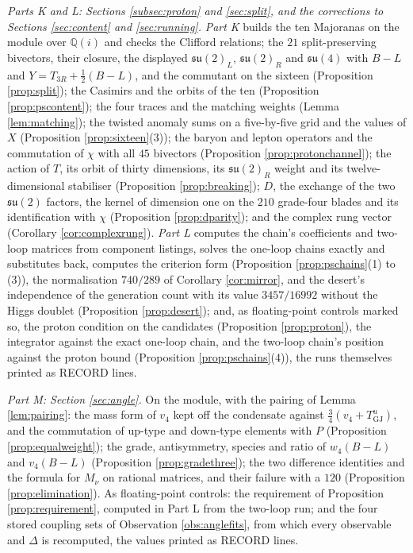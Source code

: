 \documentclass[11pt]{article}
\theoremstyle{definition}
\newcommand{\su}{\mathfrak{su}}
\begin{document}
\emph{Parts K and L: Sections \ref{subsec:proton} and \ref{sec:split}, and the corrections to Sections \ref{sec:content} and \ref{sec:running}.} \emph{Part K} builds the ten Majoranas on the module over $\mathbb{Q}(i)$ and checks the Clifford relations; the $21$ split-preserving bivectors, their closure, the displayed $\su(2)_{L}$, $\su(2)_{R}$ and $\su(4)$ with $B - L$ and $Y = T_{3R} + \tfrac12(B - L)$, and the commutant on the sixteen (Proposition \ref{prop:split}); the Casimirs and the orbits of the ten (Proposition \ref{prop:pscontent}); the four traces and the matching weights (Lemma \ref{lem:matching}); the twisted anomaly sums on a five-by-five grid and the values of $X$ (Proposition \ref{prop:sixteen}(3)); the baryon and lepton operators and the commutation of $\chi$ with all $45$ bivectors (Proposition \ref{prop:protonchannel}); the action of $T$, its orbit of thirty dimensions, its $\su(2)_{R}$ weight and its twelve-dimensional stabiliser (Proposition \ref{prop:breaking}); $D$, the exchange of the two $\su(2)$ factors, the kernel of dimension one on the $210$ grade-four blades and its identification with $\chi$ (Proposition \ref{prop:dparity}); and the complex rung vector (Corollary \ref{cor:complexrung}). \emph{Part L} computes the chain's coefficients and two-loop matrices from component listings, solves the one-loop chains exactly and substitutes back, computes the criterion form (Proposition \ref{prop:pschains}(1) to (3)), the normalisation $740/289$ of Corollary \ref{cor:mirror}, and the desert's independence of the generation count with its value $3457/16992$ without the Higgs doublet (Proposition \ref{prop:desert}); and, as floating-point controls marked so, the proton condition on the candidates (Proposition \ref{prop:proton}), the integrator against the exact one-loop chain, and the two-loop chain's position against the proton bound (Proposition \ref{prop:pschains}(4)), the runs themselves printed as RECORD lines.

\emph{Part M: Section \ref{sec:angle}.} On the module, with the pairing of Lemma \ref{lem:pairing}: the mass form of $v_{4}$ kept off the condensate against $\tfrac34(v_{4} + T^{u}_{\mathrm{GJ}})$, and the commutation of up-type and down-type elements with $P$ (Proposition \ref{prop:equalweight}); the grade, antisymmetry, species and ratio of $w_{4}(B - L)$ and $v_{4}(B - L)$ (Proposition \ref{prop:gradethree}); the two difference identities and the formula for $M_{\nu}$ on rational matrices, and their failure with a $120$ (Proposition \ref{prop:elimination}). As floating-point controls: the requirement of Proposition \ref{prop:requirement}, computed in Part L from the two-loop run; and the four stored coupling sets of Observation \ref{obs:anglefits}, from which every observable and $\Delta$ is recomputed, the values printed as RECORD lines.
\end{document}
